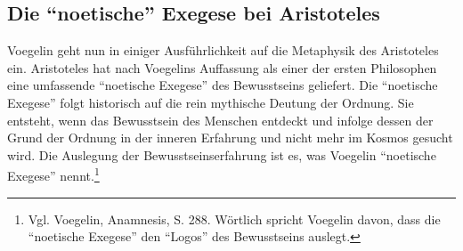 \subsection{Die "`noetische"' Exegese bei Aristoteles} 

Voegelin geht nun in einiger Ausführlichkeit auf die Metaphysik des
Aristoteles ein. Aristoteles hat nach Voegelins Auf\/fassung als einer der
ersten Philosophen eine umfassende "`noetische Exegese"' des Bewusstseins
geliefert. Die "`noetische Exegese"' folgt historisch auf die rein mythische
Deutung der Ordnung. Sie entsteht, wenn das Bewusstsein des Menschen entdeckt
und infolge dessen der Grund der Ordnung in der inneren Erfahrung und nicht
mehr im Kosmos gesucht wird. Die Auslegung der Bewusstseinserfahrung ist es,
was Voegelin "`noetische Exegese"' nennt.\footnote{Vgl. Voegelin, Anamnesis,
  S. 288.  Wörtlich spricht Voegelin davon, dass die "`noetische Exegese"' den
  "`Logos"' des Bewusstseins auslegt.}
 
